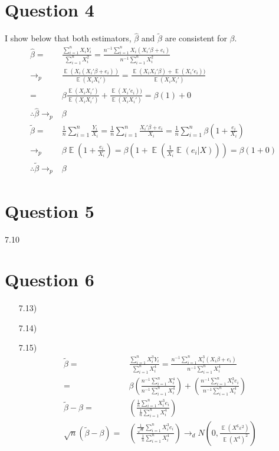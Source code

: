 \documentclass{article}
\renewcommand{\tilde}[1]{\widetilde{#1}}
\newcommand{\tb}{\tilde{\beta}}
\newcommand{\bhat}{\hat{\beta}}
\DeclareMathOperator{\E}{\mathbb{E}}%
\begin{document}
\section*{Question 4}
I show below that both estimators, $\bhat$ and $\tb$ are consistent for $\beta$.
\begin{align*}
			\bhat	= 	&\frac{\sum_{i=1}^nX_iY_i}{\sum_{i=1}^nX_i^2} = \frac{n^{-1}\sum_{i=1}^nX_i(X_i'\beta + e_i)}{n^{-1}\sum_{i=1}^nX_i^2}	\\
		\rightarrow_p	&\frac{\E(X_i(X_i'\beta + e_i))}{\E(X_iX_i')} = \frac{\E(X_iX_i'\beta) + \E(X_i'e_i))}{\E(X_iX_i')} \\
					= 	&\beta\frac{\E(X_iX_i')}{\E(X_iX_i')}+\frac{\E(X_i'e_i))}{\E(X_iX_i')} = \beta(1) + 0	\\
\therefore	\bhat\rightarrow_p&\beta																					\\
			\tb		=	&\frac{1}{n}\sum_{i=1}^n\frac{Y_i}{X_i} = \frac{1}{n}\sum_{i=1}^n\frac{X_i'\beta + e_i}{X_i} = \frac{1}{n}\sum_{i=1}^n\beta\left(1+\frac{e_i}{X_i}\right)	\\
		\rightarrow_p	&\beta\E\left(1+\frac{e_i}{X_i}\right) = \beta\left(1+\E\left(\frac{1}{X_i}\E(e_i|X)\right)\right) = \beta(1+0)	\\
\therefore	\tb\rightarrow_p&\beta																			
\end{align*}




\section*{Question 5}
7.10


\section*{Question 6}
\begin{itemize}
	\item[7.13)] 
	
	\item[7.14)] 
	
	\item[7.15)] 
	\begin{align*}
		\tb	=	& \frac{\sum_{i=1}^n X_i^3Y_i}{\sum_{i=1}^nX_i^4} = \frac{n^{-1}\sum_{i=1}^n X_i^3(X_i\beta+e_i)}{n^{-1}\sum_{i=1}^nX_i^4} \\
			= 	& \beta\left(\frac{n^{-1}\sum_{i=1}^n X_i^4}{n^{-1}\sum_{i=1}^nX_i^4}\right) + \left(\frac{n^{-1}\sum_{i=1}^n X_i^3e_i}{n^{-1}\sum_{i=1}^nX_i^4}\right)	\\
\tb - \beta	=	& \left(\frac{\frac{1}{n}\sum_{i=1}^n X_i^3e_i}{\frac{1}{n}\sum_{i=1}^nX_i^4}\right)	\\
\sqrt{n}(\tb - \beta) =	& \left(\frac{\frac{1}{\sqrt{n}}\sum_{i=1}^n X_i^3e_i}{\frac{1}{n}\sum_{i=1}^nX_i^4}\right)	\rightarrow_d N\left(0,\frac{\E(X^6\varepsilon^2)}{\E(X^4)^2}\right)
	\end{align*}
	
\end{itemize}
\end{document}
